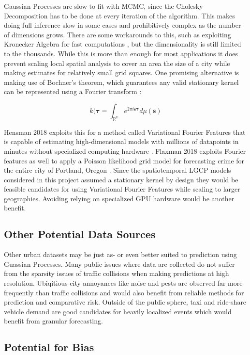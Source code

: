 Gaussian Processes are slow to fit with MCMC, since the Cholesky Decomposition has to be done at every iteration of the algorithm. This makes doing full inference slow in some cases and prohibitively complex as the number of dimensions grows. There are some workarounds to this, such as exploiting Kronecker Algebra for fast computations \cite{flaxman_2015_FastKron}, but the dimensionality is still limited to the thousands. While this is more than enough for most applications it does prevent scaling local spatial analysis to cover an area the size of a city while making estimates for relatively small grid squares. One promising alternative is making use of Bochner's theorem, which guarantees any valid stationary kernel can be represented using a Fourier transform \cite{rasmussen_2005}:

$$ k(\mathbf{\tau}=\int_{\mathbb{R^D}}e^{2\pi i \mathbf{s}\mathbf{\tau}}d\mu(\mathbf{s}) $$

Hensman 2018 exploits this for a method called Variational Fourier Features that is capable of estimating high-dimensional models with millions of datapoints in minutes without specialized computing hardware \cite{hensman_vff}. Flaxman 2018 exploits Fourier features as well to apply a Poisson likelihood grid model for forecasting crime for the entire city of Portland, Oregon \cite{flaxman_2018}. Since the spatiotemporal LGCP models considered in this project assumed a stationary kernel by design they would be feasible candidates for using Variational Fourier Features while scaling to larger geographies. Avoiding relying on specialized GPU hardware would be another benefit.


\subsection{Other Potential Data Sources}

Other urban datasets may be just as- or even better suited to prediction using Guassian Processes. Many public issues where data are collected do not suffer from the sparsity issues of traffic collisions when making predictions at high resolution. Ubiqitious city annoyances like noise and pests are observed far more frequently than traffic collisions and would also benefit from reliable methods for prediction and comparative risk. Outside of the public sphere, taxi and ride-share vehicle demand are good candidates for heavily localized events which would benefit from granular forecasting.


\subsection{Potential for Bias}


